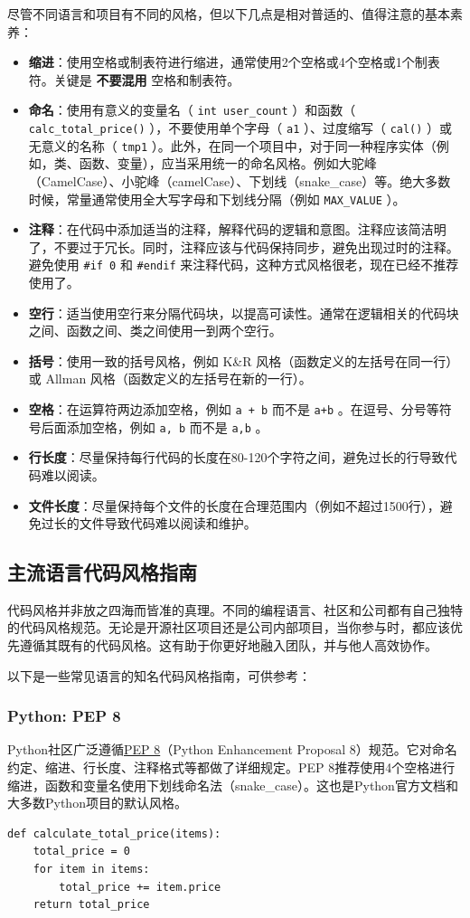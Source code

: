 尽管不同语言和项目有不同的风格，但以下几点是相对普适的、值得注意的基本素养：
\begin{itemize}
  \item \textbf{缩进}：使用空格或制表符进行缩进，通常使用2个空格或4个空格或1个制表符。关键是 \textbf{不要混用} 空格和制表符。
  \item \textbf{命名}：使用有意义的变量名（ \texttt{int user\_count} ）和函数（ \texttt{calc\_total\_price()} ），不要使用单个字母（ \texttt{a1} ）、过度缩写（ \texttt{cal()} ）或无意义的名称（ \texttt{tmp1} ）。此外，在同一个项目中，对于同一种程序实体（例如，类、函数、变量），应当采用统一的命名风格。例如大驼峰（CamelCase）、小驼峰（camelCase）、下划线（snake\_case）等。绝大多数时候，常量通常使用全大写字母和下划线分隔（例如 \texttt{MAX\_VALUE} ）。
  \item \textbf{注释}：在代码中添加适当的注释，解释代码的逻辑和意图。注释应该简洁明了，不要过于冗长。同时，注释应该与代码保持同步，避免出现过时的注释。避免使用 \texttt{\#if 0} 和 \texttt{\#endif} 来注释代码，这种方式风格很老，现在已经不推荐使用了。
  \item \textbf{空行}：适当使用空行来分隔代码块，以提高可读性。通常在逻辑相关的代码块之间、函数之间、类之间使用一到两个空行。
  \item \textbf{括号}：使用一致的括号风格，例如 K\&R 风格（函数定义的左括号在同一行）或 Allman 风格（函数定义的左括号在新的一行）。
  \item \textbf{空格}：在运算符两边添加空格，例如 \texttt{a + b} 而不是 \texttt{a+b} 。在逗号、分号等符号后面添加空格，例如 \texttt{a, b} 而不是 \texttt{a,b} 。
  \item \textbf{行长度}：尽量保持每行代码的长度在80-120个字符之间，避免过长的行导致代码难以阅读。
  \item \textbf{文件长度}：尽量保持每个文件的长度在合理范围内（例如不超过1500行），避免过长的文件导致代码难以阅读和维护。
\end{itemize}

\subsection{主流语言代码风格指南}

代码风格并非放之四海而皆准的真理。不同的编程语言、社区和公司都有自己独特的代码风格规范。无论是开源社区项目还是公司内部项目，当你参与时，都应该优先遵循其既有的代码风格。这有助于你更好地融入团队，并与他人高效协作。

以下是一些常见语言的知名代码风格指南，可供参考：

\subsubsection{Python: PEP 8}
Python社区广泛遵循\href{https://www.python.org/dev/peps/pep-0008/}{PEP 8}（Python Enhancement Proposal 8）规范。它对命名约定、缩进、行长度、注释格式等都做了详细规定。PEP 8推荐使用4个空格进行缩进，函数和变量名使用下划线命名法（snake\_case）。这也是Python官方文档和大多数Python项目的默认风格。
\begin{verbatim}
def calculate_total_price(items):
    total_price = 0
    for item in items:
        total_price += item.price
    return total_price
\end{verbatim}

